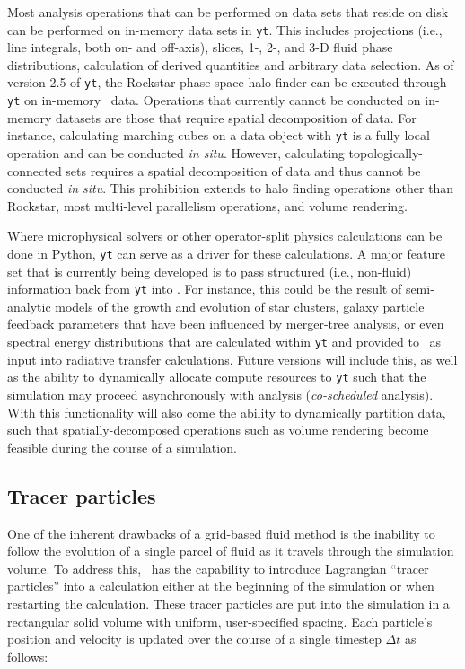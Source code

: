 Most analysis operations that can be performed on data sets that reside on
disk can be performed on in-memory data sets in \texttt{yt}.  This includes
projections (i.e., line integrals, both on- and off-axis), slices, 1-, 2-, and
3-D fluid phase distributions, calculation of derived quantities and arbitrary
data selection.  As of version 2.5 of \texttt{yt},  the Rockstar phase-space
halo finder \citep{2013ApJ...762..109B} can be executed through \texttt{yt} on
in-memory \enzo\ data.  Operations that currently cannot be conducted on
in-memory datasets are those that require spatial decomposition of
data.  For 
instance, calculating marching cubes on a data object with \texttt{yt} is a
fully local operation and can be conducted \textit{in situ}.  However,
calculating topologically-connected sets requires a spatial decomposition of
data and thus cannot be conducted \textit{in situ}.  This prohibition extends
to halo finding operations other than Rockstar, most multi-level
parallelism operations, and volume rendering.

Where microphysical solvers or other operator-split physics calculations can be
done in Python, \texttt{yt} can serve as a driver for these calculations.  A
major feature set that is currently being developed is to pass structured
(i.e., non-fluid) information back from \texttt{yt} into \enzo.  For instance,
this could be the result of semi-analytic models of the growth and evolution of
star clusters, galaxy particle feedback parameters that have been influenced by
merger-tree analysis, or even spectral energy distributions that are calculated
within \texttt{yt} and provided to \enzo\ as input into radiative transfer
calculations.  Future versions will include this, as well as the ability to
dynamically allocate compute resources to \texttt{yt} such that the simulation
may proceed asynchronously with analysis (\textit{co-scheduled} analysis).
With this functionality will also come the ability to dynamically partition
data, such that spatially-decomposed operations such as volume rendering become
feasible during the course of a simulation.

\subsection{Tracer particles}

One of the inherent drawbacks of a grid-based fluid method is the
inability to follow the evolution of a single parcel of fluid as it
travels through the simulation volume.  To address this, \enzo\ has the
capability to introduce Lagrangian ``tracer particles'' into a
calculation either at the beginning of the simulation or when
restarting the calculation.  These tracer particles are put into the
simulation in a rectangular solid volume with uniform, user-specified
spacing.  Each particle's position and velocity is updated over the
course of a single timestep $\Delta t$ as follows:


